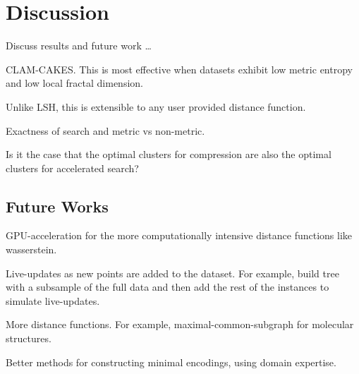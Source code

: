 \section{Discussion}
\label{sec:discussion}

Discuss results and future work \dots

CLAM-CAKES.
This is most effective when datasets exhibit low metric entropy and low local fractal dimension.

Unlike LSH, this is extensible to any user provided distance function.

Exactness of search and metric vs non-metric.

Is it the case that the optimal clusters for compression are also the optimal clusters for accelerated search?

\subsection{Future Works}
\label{subsec:results:future-works}

GPU-acceleration for the more computationally intensive distance functions like wasserstein.

Live-updates as new points are added to the dataset.
For example, build tree with a subsample of the full data and then add the rest of the instances to simulate live-updates.

More distance functions. For example, maximal-common-subgraph for molecular structures.

Better methods for constructing minimal encodings, using domain expertise.
